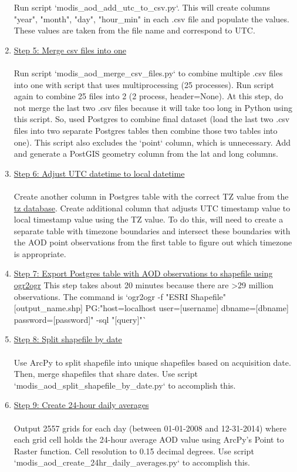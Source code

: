 \begin{enumerate}
Run script `modis\_aod\_add\_utc\_to\_csv.py`. This will create columns "year", "month", "day", "hour\_min" in each .csv file and populate the values. These values are taken from the file name and correspond to UTC.
\item \underline{Step 5: Merge csv files into one}\\\\
Run script `modis\_aod\_merge\_csv\_files.py` to combine multiple .csv files into one with script that uses multiprocessing (25 processes). Run script again to combine 25 files into 2 (2 process, header=None). At this step, do not merge the last two .csv files because it will take too long in Python using this script. So, used Postgres to combine final dataset (load the last two .csv files into two separate Postgres tables then combine those two tables into one). This script also excludes the `point` column, which is unnecessary. Add and generate a PostGIS geometry column from the lat and long columns.
\item \underline{Step 6: Adjust UTC datetime to local datetime}\\\\
Create another column in Postgres table with the correct TZ value from the \href{https://en.wikipedia.org/wiki/List_of_tz_database_time_zones}{tz database}. Create additional column that adjusts UTC timestamp value to local timestamp value using the TZ value. To do this, will need to create a separate table with timezone boundaries and intersect these boundaries with the AOD point observations from the first table to figure out which timezone is appropriate.
\item \underline{Step 7: Export Postgres table with AOD observations to shapefile using ogr2ogr} This step takes about 20 minutes because there are >29 million observations. The command is `ogr2ogr -f "ESRI Shapefile" [output\_name.shp] PG:"host=localhost user=[username] dbname=[dbname] password=[password]" -sql "[query]"` 
\item \underline{Step 8: Split shapefile by date}\\\\
Use ArcPy to split shapefile into unique shapefiles based on acquisition date. Then, merge shapefiles that share dates. Use script `modis\_aod\_split\_shapefile\_by\_date.py` to accomplish this.
\item \underline{Step 9: Create 24-hour daily averages}\\\\
Output 2557 grids for each day (between 01-01-2008 and 12-31-2014) where each grid cell holds the 24-hour average AOD value using ArcPy's Point to Raster function. Cell resolution to 0.15 decimal degrees. Use script `modis\_aod\_create\_24hr\_daily\_averages.py` to accomplish this.

\end{enumerate}


